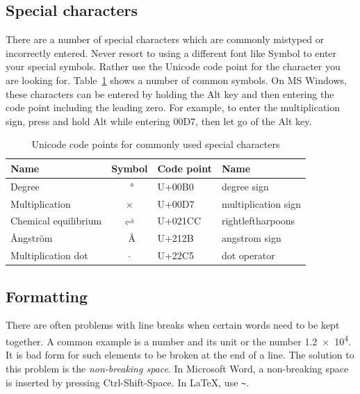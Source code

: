 \documentclass[a5paper, 10pt]{article}
\begin{document}
\subsection{Special characters}
There are a number of special characters which are commonly mistyped or incorrectly entered.
Never resort to using a different font like Symbol to enter your special symbols.
Rather use the Unicode code point for the character you are looking for.
Table~\ref{tab:specialchar} shows a number of common symbols.
On MS Windows, these characters can be entered by holding the Alt key and then entering the code point including the leading zero.
For example, to enter the multiplication sign, press and hold Alt while entering 00D7, then let go of the Alt key.
\begin{table}[htbp]
  \centering
  \begin{tabular}{lcll}
    \toprule
    Name                                                                                                  & Symbol               & Code point & Name                \\ 
    \midrule
    Degree                                                                                                & \SI{}{\degree}       & U+00B0     & degree sign         \\ 
    Multiplication                                                                                        & $\times$             & U+00D7     & multiplication sign \\
    Chemical equilibrium                                                                                  & $\rightleftharpoons$ & U+021CC    & rightleftharpoons   \\
    \AA ngstr\"om                                                                                         & \SI{}{\angstrom}     & U+212B     & angstrom sign       \\
    Multiplication dot                                                                                    & $\cdot$              & U+22C5     & dot operator        \\
    \bottomrule
  \end{tabular}
  \caption{Unicode code points for commonly used special characters}
  \label{tab:specialchar}
\end{table}

\subsection{Formatting}
\label{sec:tips-formatting}
There are often problems with line breaks when certain words need to
be kept together.  A common example is a number and its unit or the
number \num{1.2e4}.  It is bad form for such elements to be broken at
the end of a line.  The solution to this problem is the
\emph{non-breaking space}.  In Microsoft Word, a non-breaking space is
inserted by pressing Ctrl-Shift-Space.  In \LaTeX, use \verb|~|.
\end{document}
